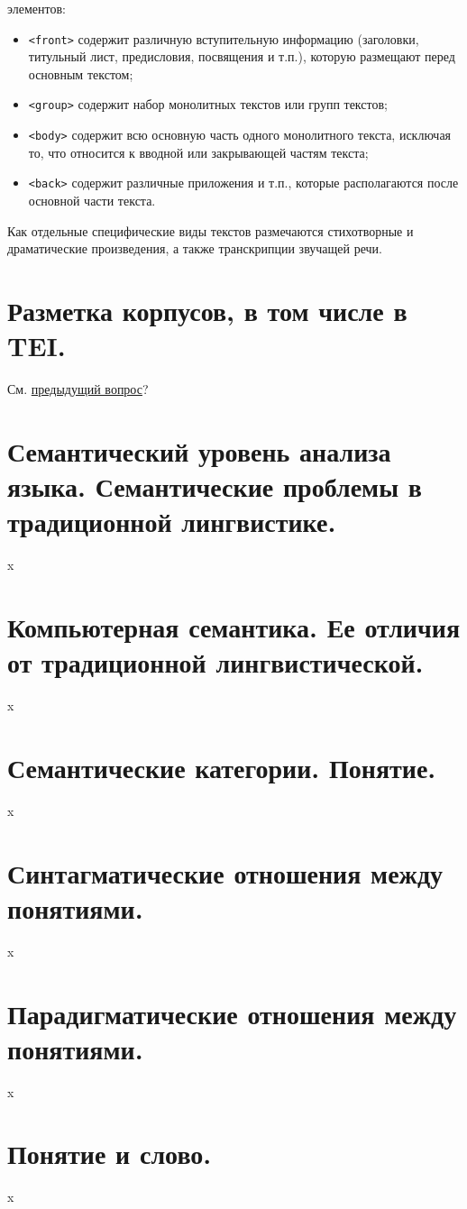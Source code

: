 \documentclass[12pt]{article}
\theoremstyle{definition}
\theoremstyle{remark}
\numberwithin{equation}{section}
\begin{document}
элементов:
\begin{itemize}
\item \texttt{<front>} содержит различную вступительную информацию (заголовки, титульный лист,
предисловия, посвящения и т.п.), которую размещают перед основным текстом;
\item \texttt{<group>} содержит набор монолитных текстов или групп текстов;
\item \texttt{<body>} содержит всю основную часть одного монолитного текста, исключая то, что
относится к вводной или закрывающей частям текста;
\item \texttt{<back>} содержит различные приложения и т.п., которые располагаются после основной
части текста.
\end{itemize}
Как отдельные специфические виды текстов размечаются стихотворные и драматические произведения, а также транскрипции звучащей речи.

\section{Разметка корпусов, в том числе в TEI.}

См. \hyperref[sec:TEI]{предыдущий вопрос}?

\section{Семантический уровень анализа языка. Семантические проблемы в традиционной лингвистике.}
x
\section{Компьютерная семантика. Ее отличия от традиционной лингвистической.}
x
\section{Семантические категории. Понятие.}
x
\section{Синтагматические отношения между понятиями.}
x
\section{Парадигматические отношения между понятиями.} 
x
\section{Понятие и слово.}
x
\end{document}

